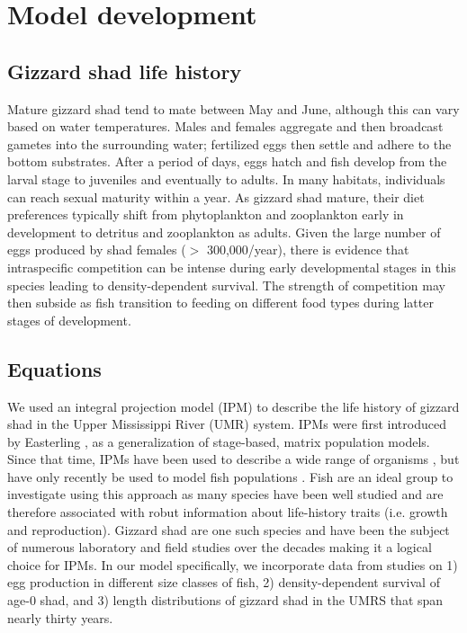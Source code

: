 \documentclass[preprint,review,12pt,authoryear]{elsarticle}
\begin{document}
\section{Model development}
\subsection{Gizzard shad life history}
Mature gizzard shad tend to mate between May and June, although this can vary based on water temperatures. 
Males and females aggregate and then broadcast gametes into the surrounding water; fertilized eggs then settle and adhere to the bottom substrates. 
After a period of days, eggs hatch and fish develop from the larval stage to juveniles and eventually to adults. 
In many habitats, individuals can reach sexual maturity within a year. 
As gizzard shad mature, their diet preferences typically shift from phytoplankton and zooplankton early in development to detritus and zooplankton as adults. 
Given the large number of eggs produced by shad females ($>$ 300,000/year), there is evidence that intraspecific competition can be intense during early developmental stages in this species leading to density-dependent survival. 
The strength of competition may then subside as fish transition to feeding on different food types during latter stages of development.   

\subsection{Equations}
We used an integral projection model (IPM) to describe the life history of gizzard shad in the Upper Mississippi River (UMR) system. 
IPMs were first introduced by Easterling \citep{easterling2000size}, as a generalization of stage-based, matrix population models. 
Since that time, IPMs have been used to describe a wide range of organisms \citep{ellner2016data, merow2014advancing, rees2014building}, but have only recently be used to model fish populations \citep{erickson2017integral, liao2019dynamic, white2016fitting, pollesch2022developing}. Fish are an ideal group to investigate using this approach as many species have been well studied and are therefore associated with robut information about life-history traits (i.e. growth and reproduction). Gizzard shad are one such species and have been the subject of numerous laboratory and field studies over the decades making it a logical choice for IPMs.
In our model specifically, we incorporate data from studies on 1) egg production in different size classes of fish, 2) density-dependent survival of age-0 shad, and 3) length distributions of gizzard shad in the UMRS that span nearly thirty years.
\end{document}
